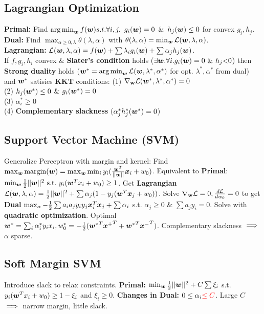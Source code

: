 \subsection*{Lagrangian Optimization}
\textbf{Primal:} Find $\operatorname*{arg\,min}_{\bm{w}} f({\bm{w}})\\s.t. \forall i,j.\,\,\,g_i({\bm{w}})=0\,\,\,\&\,\,\,h_j({\bm{w}}) \leq 0$ for convex $g_i, h_j$.\\
\textbf{Dual:} Find $\max_{\alpha\geq0,\lambda} {\theta(\lambda, \alpha)}$ with ${\theta(\lambda, \alpha)} = \min_{\bm{w}}\mathcal{L}({\bm{w}}, \lambda, \alpha)$.\\
\textbf{Lagrangian:} $\mathcal{L}({\bm{w}}, \mathbf{\lambda}, \mathbf{\alpha}) = f({\bm{w}}) + \sum\lambda_i g_i({\bm{w}}) + \sum\alpha_j h_j({\bm{w}})$.\\
If $f, g_i, h_i$ convex \& \textbf{Slater's condition} holds \mbox{($\exists {\bm{w}}. \forall i. g_i({\bm{w}})=0\,\,\&\,\,h_j\mathbf{<}0$)} then \textbf{Strong duality} holds (${\bm{w}}^* = \operatorname*{arg\,min}_{\bm{w}} \mathcal{L}({\bm{w}}, \lambda^*, \alpha^*)$ for opt. $\lambda^*, \alpha^*$ from dual) and ${\bm{w}}^*$ satisies \textbf{KKT} conditions: (1) $\nabla_{\mathbf{w}}\mathcal{L}({\bm{w}}^*,\lambda^*,\alpha^*)=0$\\
(2) $h_j({\bm{w}}^*) \leq 0$ \& $g_i({\bm{w}}^*) = 0$\\
(3) $\alpha^*_i \geq 0$\\
(4) \textbf{Complementary slackness} ($\alpha^*_jh^*_j({\bm{w}}^*) = 0$)

\subsection*{Support Vector Machine (SVM)}
Generalize Perceptron with margin and kernel:
Find $\max_{\bm{w}} \mathrm{margin}({\bm{w}}) = \max_{\bm{w}}\min_i y_i(\frac{{\bm{w}}^T}{||{\bm{w}}||}{\bm{x}}_i + w_0)$. Equivalent to \textbf{Primal}: $\min_{\bm{w}} \frac{1}{2}||{\bm{w}}||^2\,\,\mathrm{s.t.}\,\, y_i({\bm{w}}^Tx_i+w_0) \geq 1$. Get \textbf{Lagrangian} $\mathcal{L}({\bm{w}}, \lambda, \alpha) = \frac{1}{2}||{\bm{w}}||^2 + \sum\alpha_j (1-y_j({\bm{w}}^T{\bm{x}}_j+w_0))$. Solve $\nabla_{\mathbf{w}}\mathcal{L}=0, \frac{d\mathcal{L}}{dw_0}=0$ to get \textbf{Dual} $\max_\alpha -\frac{1}{2}\sum a_ia_jy_iy_j{\bm{x}}^T_i{\bm{x}}_j + \sum\alpha_i$ s.t.
$\alpha_j\geq 0$ \& $\sum a_jy_i = 0$. Solve with \textbf{quadratic optimization}. Optimal ${\bm{w}}^* = \sum_i \alpha^*_i y_i x_i, w_0^* = -\frac{1}{2}({{\bm{w}}^*}^T{{\bm{x}}^+}^T + {{\bm{w}}^*}^T{{\bm{x}}^-}^T)$. Complementary slackness $\color{black}\implies$ $\alpha$ sparse.
\subsection*{Soft Margin SVM}
Introduce slack to relax constraints.
\textbf{Primal:} $\min_{\bm{w}} \frac{1}{2}||{\bm{w}}||^2 + C\sum\xi_i$ s.t. $y_i({\bm{w}}^Tx_i+w_0) \geq 1-\xi_i$ and $\xi_i \geq 0$.
\textbf{Changes in Dual:} $0\leq\alpha_i{\color{red}\leq C}$.
Large $C$ $\color{black}\implies$ narrow margin, little slack. 

